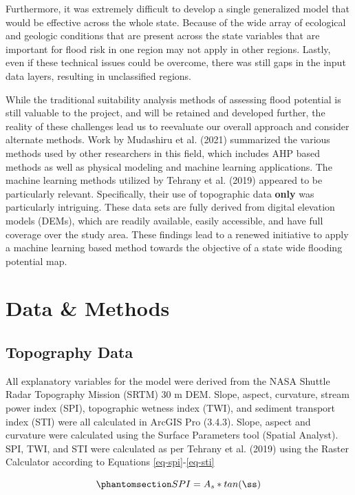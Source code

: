 \documentclass[
]{agujournal2019}
\begin{document}
Furthermore, it was extremely difficult to develop a single generalized
model that would be effective across the whole state. Because of the
wide array of ecological and geologic conditions that are present across
the state variables that are important for flood risk in one region may
not apply in other regions. Lastly, even if these technical issues could
be overcome, there was still gaps in the input data layers, resulting in
unclassified regions.

While the traditional suitability analysis methods of assessing flood
potential is still valuable to the project, and will be retained and
developed further, the reality of these challenges lead us to reevaluate
our overall approach and consider alternate methods. Work by Mudashiru
et al. (2021) summarized the various methods used by other researchers
in this field, which includes AHP based methods as well as physical
modeling and machine learning applications. The machine learning methods
utilized by Tehrany et al. (2019) appeared to be particularly relevant.
Specifically, their use of topographic data \textbf{only} was
particularly intriguing. These data sets are fully derived from digital
elevation models (DEMs), which are readily available, easily accessible,
and have full coverage over the study area. These findings lead to a
renewed initiative to apply a machine learning based method towards the
objective of a state wide flooding potential map.

\section{Data \& Methods}\label{sec-data-methods}

\subsection{Topography Data}\label{topography-data}

All explanatory variables for the model were derived from the NASA
Shuttle Radar Topography Mission (SRTM) 30 m DEM. Slope, aspect,
curvature, stream power index (SPI), topographic wetness index (TWI),
and sediment transport index (STI) were all calculated in ArcGIS Pro
(3.4.3). Slope, aspect and curvature were calculated using the Surface
Parameters tool (Spatial Analyst). SPI, TWI, and STI were calculated as
per Tehrany et al. (2019) using the Raster Calculator according to
Equations \ref{eq-spi}-\ref{eq-sti}

\begin{equation}\phantomsection\label{eq-spi}{
SPI = A_s * tan(ß)
}\end{equation}
\end{document}
